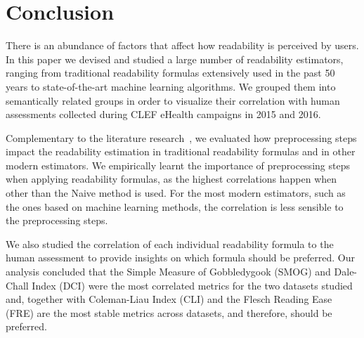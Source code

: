 



\section{Conclusion}
\label{sec:conclusion_doc_analysis}

There is an abundance of factors that affect how readability is perceived by users. 
In this paper we devised and studied a large number of readability estimators, ranging from traditional readability formulas extensively used in the past 50 years to state-of-the-art machine learning algorithms.
We grouped them into semantically related groups in order to visualize their correlation with human assessments collected during CLEF eHealth campaigns in 2015 and 2016.

Complementary to the literature research~\cite{palotti15}, we evaluated how preprocessing steps impact the readability estimation in traditional readability formulas and in other modern estimators. We empirically learnt the importance of preprocessing steps when applying readability formulas, as the highest correlations happen when other than the Naive method is used.
For the most modern estimators, such as the ones based on machine learning methods, the correlation is less sensible to the preprocessing steps.

We also studied the correlation of each individual readability formula to the human assessment to provide insights on which formula should be preferred. Our analysis concluded that the Simple Measure of Gobbledygook (SMOG) and Dale-Chall Index (DCI) were the most correlated metrics for the two datasets studied and, together with Coleman-Liau Index (CLI) and the Flesch Reading Ease (FRE) are the most stable metrics across datasets, and therefore, should be preferred.


